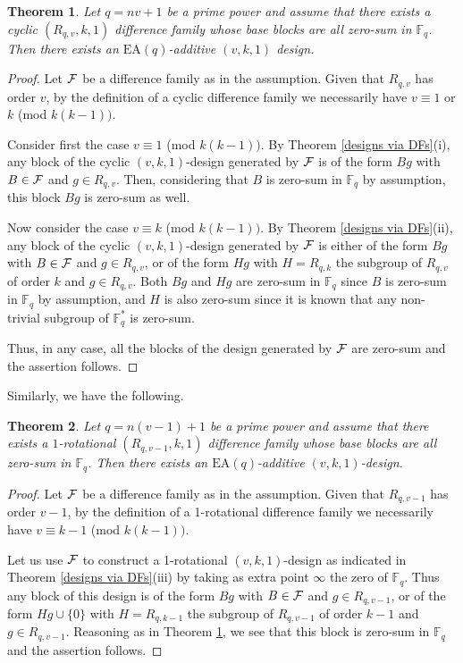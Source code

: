 \documentclass[a4paper, 11pt]{article}
\newtheorem{theorem}{Theorem}[section]
\theoremstyle{definition}
\theoremstyle{definition}
\theoremstyle{definition}
\newcommand{\F}{\mathbb{F}}
\numberwithin{equation}{section}
\begin{document}
\begin{theorem}\label{CA}
Let $q=nv+1$ be a prime power and assume that
there exists a cyclic $(R_{q,v},k,1)$ difference family whose base blocks are all zero-sum
in $\F_q$. Then there exists an $\mathrm{EA}(q)$-additive $(v,k,1)$ design.
\end{theorem}
\begin{proof}
Let $\cal F$ be a difference family as in the assumption. Given that $R_{q,v}$ has order $v$, by the
definition of a cyclic difference family we necessarily have $v\equiv 1$ or $k$ (mod $k(k-1))$.

Consider first the case $v\equiv1$ (mod $k(k-1))$.
By Theorem \ref{designs via DFs}(i), any block of the cyclic $(v,k,1)$-design generated by $\cal F$ is of the form
$Bg$ with $B\in{\cal F}$ and $g\in R_{q,v}$. Then, considering that $B$ is zero-sum in $\F_q$ by assumption, this block
$Bg$ is zero-sum as well. 

Now consider the case $v\equiv k$ (mod $k(k-1))$.
By Theorem \ref{designs via DFs}(ii), any block of the cyclic $(v,k,1)$-design generated by $\cal F$ is either of the form
$Bg$ with $B\in{\cal F}$ and $g\in R_{q,v}$, or of the form $Hg$ with $H=R_{q,k}$ the subgroup of $R_{q,v}$ of order $k$ and $g\in R_{q,v}$. 
Both $Bg$ and $Hg$ are zero-sum in $\F_q$ since $B$ is zero-sum in $\F_q$ by assumption, and $H$ is also zero-sum since it is
known that any non-trivial subgroup of $\F_q^*$ is zero-sum. 

Thus, in any case, all the blocks of the design generated by $\cal F$ are zero-sum and the assertion follows.
\end{proof}

Similarly, we have the following.

\begin{theorem}\label{1rA}
Let $q=n(v-1)+1$ be a prime power and assume that
there exists a $1$-rotational $(R_{q,v-1},k,1)$ difference family whose base blocks are all zero-sum
in $\F_q$. Then there exists an $\mathrm{EA}(q)$-additive $(v,k,1)$-design.
\end{theorem}
\begin{proof}
Let $\cal F$ be a difference family as in the assumption. Given that $R_{q,v-1}$ has order $v-1$, by the
definition of a 1-rotational difference family we necessarily have $v\equiv k-1$ (mod $k(k-1))$.

Let us use $\cal F$ to construct a 1-rotational $(v,k,1)$-design as indicated in Theorem \ref{designs via DFs}(iii) 
by taking as extra point $\infty$ the zero of $\F_q$.
Thus any block of this design is of the form $Bg$ with $B\in{\cal F}$ and $g\in R_{q,v-1}$, or of the form $Hg\cup\{0\}$ with 
$H=R_{q,k-1}$ the subgroup of $R_{q,v-1}$ of order $k-1$ and $g\in R_{q,v-1}$. 
Reasoning as in Theorem \ref{CA}, we see that this block is zero-sum in $\F_q$ and the assertion follows.
\end{proof}
\end{document}
